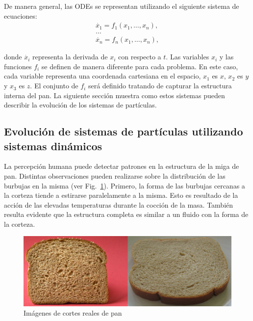 \documentclass[oneside,a4paper,spanish,links]{amca}
\begin{document}
De manera general, las ODEs se representan utilizando el siguiente sistema de ecuaciones:
\begin{equation} \label{eq:simple}  
  \begin{aligned}
    \dot{x_{1}} = f_{1}(x_{1},\ldots,x_{n}),\\
    \ldots\\
    \dot{x_{n}} = f_{n}(x_{1},\ldots,x_{n}),
  \end{aligned}
\end{equation}

\noindent donde $\dot{x_{i}}$ representa la derivada de $x_{i}$ con respecto
a $t$. Las variables $x_{i}$ y las funciones $f_{i}$ se definen de manera diferente para cada problema. En este caso, cada variable representa una coordenada cartesiana en el espacio, $x_{1}$ es $x$, $x_{2}$ es $y$ y $x_{3}$ es $z$. El conjunto de $f_{i}$ ser\'a definido tratando de capturar la estructura interna del pan. La siguiente secci\'on muestra como estos sistemas pueden describir la evoluci\'on de los sistemas de part\'iculas.

\subsection{Evoluci\'on de sistemas de part\'iculas utilizando sistemas din\'amicos}

La percepci\'on humana puede detectar patrones en la estructura de la miga de pan. Distintas observaciones pueden realizarse sobre la distribuci\'on de las burbujas en la misma (ver Fig.~\ref{fg:fig2}). Primero, la forma de las burbujas cercanas a la corteza tiende a estirarse paralelamente a la misma. Esto es resultado de la acci\'on de las elevadas temperaturas durante la cocci\'on de la masa. Tambi\'en resulta evidente que la estructura completa es similar a un fluido con la forma de la corteza.


\begin{figure}[htb!]
  \centerline{\includegraphics[scale=0.45]{fig2}}
  \caption{Im\'agenes de cortes reales de pan}
  \label{fg:fig2}
\end{figure}
\end{document}
